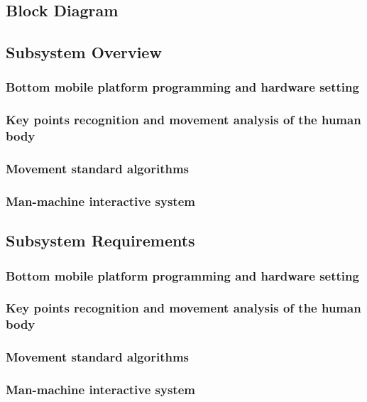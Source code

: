 \subsection{Block Diagram}

\subsection{Subsystem Overview}

\subsubsection{Bottom mobile platform programming and hardware setting}

\subsubsection{Key points recognition and movement analysis of the human body}

\subsubsection{Movement standard algorithms}

\subsubsection{Man-machine interactive system}

\subsection{Subsystem Requirements}

\subsubsection{Bottom mobile platform programming and hardware setting}

\subsubsection{Key points recognition and movement analysis of the human body}

\subsubsection{Movement standard algorithms}

\subsubsection{Man-machine interactive system}

